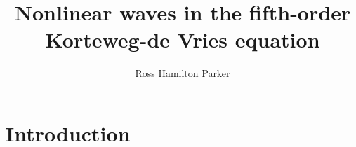 \documentclass[11pt,reqno,oneside]{report}
\title{Nonlinear waves in the fifth-order Korteweg-de Vries equation}
\author{Ross Hamilton Parker}
\theoremstyle{plain}
\theoremstyle{definition}
\theoremstyle{remark}
\numberwithin{section}{chapter}
\numberwithin{equation}{chapter}
\numberwithin{figure}{chapter}
\newif\iffulldocument
\begin{document}


\begin{preliminaries}

\maketitle

\copyrightpage

\begin{signature}
\end{signature}

\begin{vita}\label{thesis:vita}
  
\end{vita}

\begin{dedication}\label{thesis:dedication}
  
\end{dedication}

\begin{acknowledgments}\label{thesis:acknowledgments}
  
\end{acknowledgments}

\begin{abstract}\label{thesis:abstract}
  \thispagestyle{empty}
  
  \thispagestyle{empty}
\end{abstract}

\begin{spacing}{1} %
  \tableofcontents
  \clearpage{\pagestyle{empty}\cleardoublepage}

  \footnotesize
  \fontsize{11.5pt}{12.5pt}\selectfont
  \listoftables
  \clearpage{\pagestyle{empty}\cleardoublepage}

  \listoffigures
  \clearpage{\pagestyle{empty}\cleardoublepage}
  \normalsize
\end{spacing}

\end{preliminaries}

\pagestyle{plain}

\fulldocumenttrue

\chapter{Introduction}\label{chapter:intro}

\end{document}
